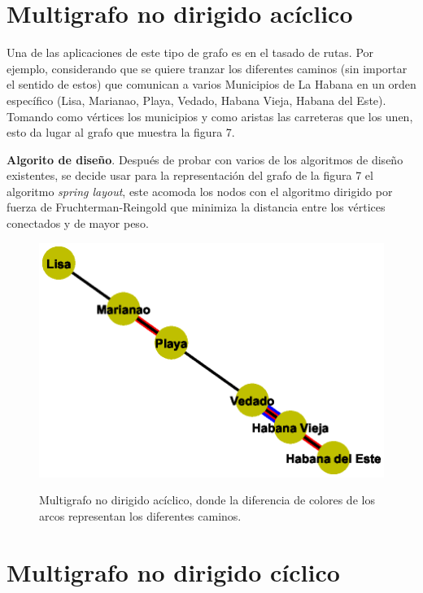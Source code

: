\documentclass{article}
\begin{document}
 \section{Multigrafo no dirigido acíclico}
Una de las aplicaciones de este tipo de grafo es en el tasado de rutas.
Por ejemplo, considerando que se quiere tranzar los diferentes caminos (sin importar el sentido de estos) que comunican a varios Municipios de La Habana en un orden específico (Lisa, Marianao, Playa, Vedado, Habana Vieja, Habana del Este). Tomando como vértices los municipios y como aristas las carreteras que los unen, esto da lugar al grafo que muestra la figura 7.\linebreak

\textbf{Algorito de diseño}.\linebreak
Después de probar con varios de los algoritmos de diseño existentes, se decide usar para la representación del grafo de la figura 7 el algoritmo \textit{spring layout}, este acomoda los nodos con el algoritmo dirigido por fuerza de Fruchterman-Reingold que minimiza la distancia entre los vértices conectados y de mayor peso.
\begin{center}

\end{center}
\begin{figure}[h]
\begin{center}
\includegraphics[scale=0.7]{Graf7_spring_layout.eps}\\
\caption{Multigrafo no dirigido acíclico, donde la diferencia de colores de los arcos representan los diferentes caminos.}
\end{center}
\end{figure}
\section{Multigrafo no dirigido cíclico}
\end{document}
